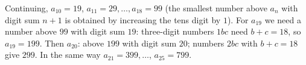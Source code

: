 Continuing, $a_{10}=19$, $a_{11}=29,\dots,a_{18}=99$ (the smallest number above $a_n$ with digit sum $n+1$ is obtained by increasing the tens digit by $1$). For $a_{19}$ we need a number above $99$ with digit sum $19$: three-digit numbers $1bc$ need $b+c=18$, so $a_{19}=199$. Then $a_{20}$: above $199$ with digit sum $20$; numbers $2bc$ with $b+c=18$ give $299$. In the same way $a_{21}=399,\dots$, $a_{25}=\boxed{799}$.
